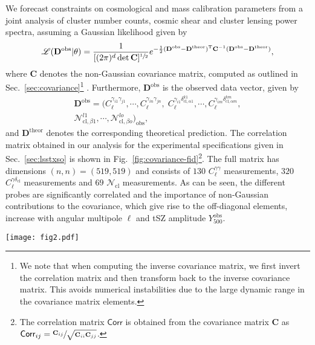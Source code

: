 \documentclass[%
 reprint,
nofootinbib,
 amsmath,amssymb,
 aps,
]{revtex4-1}
\begin{document}
We forecast constraints on cosmological and mass calibration parameters from a joint analysis of cluster number counts, cosmic shear and cluster lensing power spectra, assuming a Gaussian likelihood given by 
\begin{equation}
\mathscr{L}(\mathbf{D}^{\mathrm{obs}} \vert \theta) = \frac{1}{[(2\pi)^{d}\det{\mathbf{C}}]^{\sfrac{1}{2}}} e^{-\frac{1}{2}(\mathbf{D}^{\mathrm{obs}}-\mathbf{D}^{\mathrm{theor}})^{\mathrm{T}}\mathbf{C}^{-1}(\mathbf{D}^{\mathrm{obs}}-\mathbf{D}^{\mathrm{theor}})},
\label{eq:likelihood}
\end{equation}
where $\mathbf{C}$ denotes the non-Gaussian covariance matrix, computed as outlined in Sec.~\ref{sec:covariance}\footnote{We note that when computing the inverse covariance matrix, we first invert the correlation matrix and then transform back to the inverse covariance matrix. This avoids numerical instabilities due to the large dynamic range in the covariance matrix elements.} . Furthermore, $\mathbf{D}^{\mathrm{obs}}$ is the observed data vector, given by 
\begin{multline}
\mathbf{D}^{\mathrm{obs}} = (C^{\gamma_{i1} \gamma_{j1}}_{\ell}, \cdots, C^{\gamma_{in} \gamma_{jn}}_{\ell}, \; C_{\ell}^{\gamma_{i1}  \delta^{k1}_{\mathrm{cl}, \alpha 1}}, \cdots,  C_{\ell}^{\gamma_{im}  \delta^{km}_{\mathrm{cl}, \alpha m}}, \\
\mathcal{N}^{l1}_{\mathrm{cl}, \beta 1}, \cdots, \mathcal{N}^{lo}_{\mathrm{cl}, \beta o})_{\mathrm{obs}},
\label{eq:psvector}
\end{multline} 
and $\mathbf{D}^{\mathrm{theor}}$ denotes the corresponding theoretical prediction. The correlation matrix obtained in our analysis for the experimental specifications given in Sec.~\ref{sec:lsstxso} is shown in Fig.~\ref{fig:covariance-fid}\footnote{The correlation matrix $\mathsf{Corr}$ is obtained from the covariance matrix $\mathbf{C}$ as $\mathsf{Corr}_{ij} = \sfrac{\mathbf{C}_{ij}}{\sqrt{\mathbf{C}_{ii} \mathbf{C}_{jj}}}$.}. The full matrix has dimensions $(n, n) = (519, 519)$  and consists of $130$ $C^{\gamma \gamma}_{\ell}$ measurements, $320$ $C_{\ell}^{\gamma  \delta_{\mathrm{cl}}}$ measurements and $69$ $\mathcal{N}_{\mathrm{cl}}$ measurements. As can be seen, the different probes are significantly correlated and the importance of non-Gaussian contributions to the covariance, which give rise to the off-diagonal elements, increase with angular multipole $\ell$ and tSZ amplitude $Y^{\mathrm{obs}}_{500}$.

\begin{figure*}
\begin{center}
\texttt{[image: fig2.pdf]}
 \caption{Joint correlation matrix of tSZ cluster number counts, cosmic shear and the cross-correlation between cluster overdensity and cosmic shear obtained in this analysis.}
\label{fig:covariance-fid}
\end{center}
\end{figure*}
\end{document}
